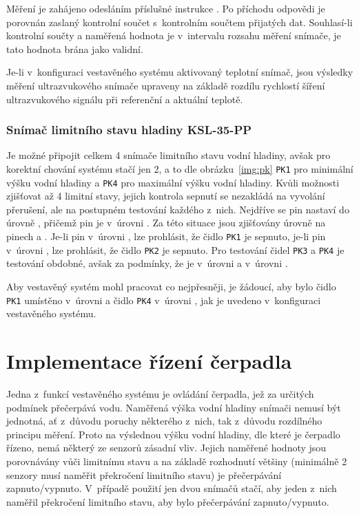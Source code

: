             Měření je zahájeno odesláním příslušné instrukce . Po příchodu odpovědi je porovnán zaslaný kontrolní součet s~kontrolním součtem přijatých dat. Souhlasí-li kontrolní součty a naměřená hodnota je v~intervalu rozsahu měření snímače, je tato hodnota brána jako validní.

            Je-li v~konfiguraci vestavěného systému aktivovaný teplotní snímač, jsou výsledky měření ultrazvukového snímače  upraveny na základě rozdílu rychlostí šíření ultrazvukového signálu při referenční a aktuální teplotě.

        \subsubsection{Snímač limitního stavu hladiny KSL-35-PP}
            Je možné připojit celkem 4 snímače limitního stavu vodní hladiny, avšak pro korektní chování systému stačí jen 2, a to dle obrázku~\ref{img:pk} \texttt{PK1} pro minimální výšku vodní hladiny a \texttt{PK4} pro maximální výšku vodní hladiny. Kvůli možnosti zjišťovat až 4 limitní stavy, jejich kontrola sepnutí se nezakládá na vyvolání přerušení, ale na postupném testování každého z~nich. Nejdříve se pin  nastaví do úrovně , přičemž pin  je v~úrovni . Za této situace jsou zjišťovány úrovně na pinech  a . Je-li pin  v~úrovni , lze prohlásit, že čidlo \texttt{PK1} je sepnuto, je-li pin  v~úrovni , lze prohlásit, že čidlo \texttt{PK2} je sepnuto. Pro testování čidel \texttt{PK3} a \texttt{PK4} je testování obdobné, avšak za podmínky, že  je v~úrovni  a  v~úrovni .

            Aby vestavěný systém mohl pracovat co nejpřesněji, je žádoucí, aby bylo čidlo \texttt{PK1} umístěno v~úrovni  a čidlo \texttt{PK4} v~úrovni , jak je uvedeno v~konfiguraci vestavěného systému. 

    \newpage
    \section{Implementace řízení čerpadla}
        Jedna z~funkcí vestavěného systému je ovládání čerpadla, jež za určitých podmínek přečerpává vodu. Naměřená výška vodní hladiny snímači nemusí být jednotná, ať z~důvodu poruchy některého z~nich, tak z~důvodu rozdílného principu měření. Proto na výslednou výšku vodní hladiny, dle které je čerpadlo řízeno, nemá některý ze senzorů zásadní vliv. Jejich naměřené hodnoty jsou porovnávány vůči limitnímu stavu a na základě rozhodnutí většiny (minimálně 2 senzory musí naměřit překročení limitního stavu) je přečerpávání zapnuto/vypnuto. V~případě použití jen dvou snímačů stačí, aby jeden z~nich naměřil překročení limitního stavu, aby bylo přečerpávání zapnuto/vypnuto.


